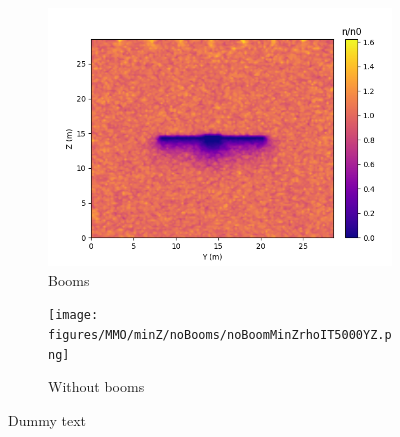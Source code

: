 \begin{center}
    \begin{figure}[H]
      \begin{subfigure}[b]{0.61\textwidth}
      \includegraphics[width=\textwidth]{figures/MMO/minZ/Booms/BoomMinZrhoIT5000YZ.png}
      \caption{Booms}
      \label{fig:BoomMinZrhoI}
    \end{subfigure}
    \begin{subfigure}[b]{0.61\textwidth}
      \texttt{[image: figures/MMO/minZ/noBooms/noBoomMinZrhoIT5000YZ.png]}
      \caption{Without booms}
      \label{fig:noBoomMinZrhoI}
    \end{subfigure}
  \label{fig:noBoomMinZrhoIMain}
  \caption{Dummy text}
  \end{figure}
\end{center}

